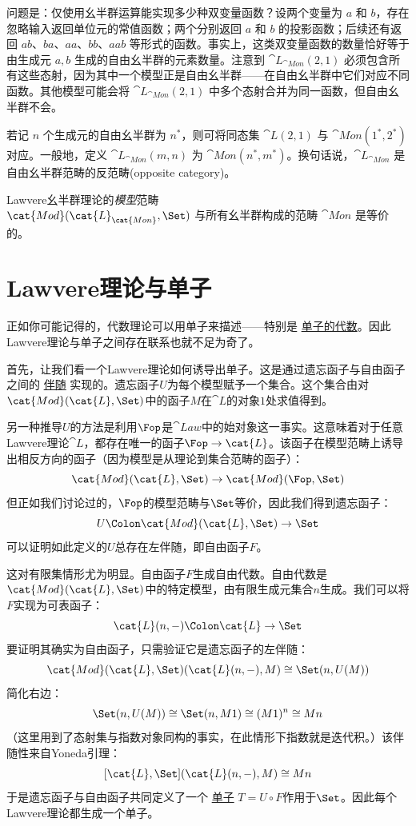 问题是：仅使用幺半群运算能实现多少种双变量函数？设两个变量为 $a$ 和 $b$，存在忽略输入返回单位元的常值函数；两个分别返回 $a$ 和 $b$ 的投影函数；后续还有返回 $ab$、$ba$、$aa$、$bb$、$aab$ 等形式的函数。事实上，这类双变量函数的数量恰好等于由生成元 $a,b$ 生成的自由幺半群的元素数量。注意到 $\cat{L}_{\cat{Mon}}(2, 1)$ 必须包含所有这些态射，因为其中一个模型正是自由幺半群——在自由幺半群中它们对应不同函数。其他模型可能会将 $\cat{L}_{\cat{Mon}}(2, 1)$ 中多个态射合并为同一函数，但自由幺半群不会。

若记 $n$ 个生成元的自由幺半群为 $n^*$，则可将同态集 $\cat{L}(2, 1)$ 与 $\cat{Mon}(1^*, 2^*)$ 对应。一般地，定义 $\cat{L}_{\cat{Mon}}(m, n)$ 为 $\cat{Mon}(n^*, m^*)$。换句话说，$\cat{L}_{\cat{Mon}}$ 是自由幺半群范畴的反范畴(opposite category)。

Lawvere幺半群理论的\emph{模型}范畴\\
$\cat{Mod}(\cat{L}_{\cat{Mon}}, \Set)$ 与所有幺半群构成的范畴 $\cat{Mon}$ 是等价的。

\section{Lawvere理论与单子}

正如你可能记得的，代数理论可以用单子来描述——特别是
\hyperref[algebras-for-monads]{单子的代数}。因此Lawvere理论与单子之间存在联系也就不足为奇了。

首先，让我们看一个Lawvere理论如何诱导出单子。这是通过遗忘函子与自由函子之间的
\hyperref[free-forgetful-adjunctions]{伴随}
实现的。遗忘函子$U$为每个模型赋予一个集合。这个集合由对$\cat{Mod}(\cat{L}, \Set)$中的函子$M$在$\cat{L}$的对象$1$处求值得到。

另一种推导$U$的方法是利用$\Fop$是$\cat{Law}$中的始对象这一事实。这意味着对于任意Lawvere理论$\cat{L}$，都存在唯一的函子$\Fop \to \cat{L}$。该函子在模型范畴上诱导出相反方向的函子（因为模型是从理论到集合范畴的函子）：
$$\cat{Mod}(\cat{L}, \Set) \to \cat{Mod}(\Fop, \Set)$$
但正如我们讨论过的，$\Fop$的模型范畴与$\Set$等价，因此我们得到遗忘函子：
$$U \Colon \cat{Mod}(\cat{L}, \Set) \to \Set$$
可以证明如此定义的$U$总存在左伴随，即自由函子$F$。

这对有限集情形尤为明显。自由函子$F$生成自由代数。自由代数是$\cat{Mod}(\cat{L}, \Set)$中的特定模型，由有限生成元集合$n$生成。我们可以将$F$实现为可表函子：
$$\cat{L}(n, -) \Colon \cat{L} \to \Set$$
要证明其确实为自由函子，只需验证它是遗忘函子的左伴随：
$$\cat{Mod}(\cat{L}, \Set)(\cat{L}(n, -), M) \cong \Set(n, U(M))$$
简化右边：
$$\Set(n, U(M)) \cong \Set(n, M 1) \cong (M 1)^n \cong M n$$
（这里用到了态射集与指数对象同构的事实，在此情形下指数就是迭代积。）该伴随性来自Yoneda引理：
$$[\cat{L}, \Set](\cat{L}(n, -), M) \cong M n$$
于是遗忘函子与自由函子共同定义了一个
\hyperref[monads-categorically]{单子}
$T = U \circ F$作用于$\Set$。因此每个Lawvere理论都生成一个单子。

